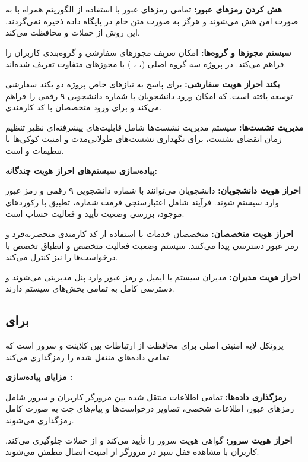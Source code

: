\documentclass[12pt,a4paper]{report}
\begin{document}
	\textbf{هش کردن رمزهای عبور:} تمامی رمزهای عبور با استفاده از الگوریتم  همراه با  به صورت امن هش می‌شوند و هرگز به صورت متن خام در پایگاه داده ذخیره نمی‌گردند. این روش از حملات  و  محافظت می‌کند.
	
	\textbf{سیستم مجوزها و گروه‌ها:}  امکان تعریف مجوزهای سفارشی و گروه‌بندی کاربران را فراهم می‌کند. در پروژه سه گروه اصلی (، ، ) با مجوزهای متفاوت تعریف شده‌اند.
	
	\textbf{بکند احراز هویت سفارشی:} برای پاسخ به نیازهای خاص پروژه دو بکند سفارشی توسعه یافته است.  که امکان ورود دانشجویان با شماره دانشجویی ۹ رقمی را فراهم می‌کند و  برای ورود متخصصان با کد کارمندی.
	
	\textbf{مدیریت نشست‌ها:} سیستم مدیریت نشست‌ها شامل قابلیت‌های پیشرفته‌ای نظیر تنظیم زمان انقضای نشست،  برای نگهداری نشست‌های طولانی‌مدت و امنیت کوکی‌ها با تنظیمات  و  است.
	
	\textbf{پیاده‌سازی سیستم‌های احراز هویت چندگانه:}
	
	\textbf{احراز هویت دانشجویان:} دانشجویان می‌توانند با شماره دانشجویی ۹ رقمی و رمز عبور وارد سیستم شوند. فرآیند شامل اعتبارسنجی فرمت شماره، تطبیق با رکوردهای موجود، بررسی وضعیت تأیید و فعالیت حساب است.
	
	\textbf{احراز هویت متخصصان:} متخصصان خدمات با استفاده از کد کارمندی منحصربه‌فرد و رمز عبور دسترسی پیدا می‌کنند. سیستم وضعیت فعالیت متخصص و انطباق تخصص با درخواست‌ها را نیز کنترل می‌کند.
	
	\textbf{احراز هویت مدیران:} مدیران سیستم با ایمیل و رمز عبور وارد پنل مدیریتی می‌شوند و دسترسی کامل به تمامی بخش‌های سیستم دارند.
	
	\subsection{ برای }
	پروتکل  لایه امنیتی اصلی برای محافظت از ارتباطات بین کلاینت و سرور است که تمامی داده‌های منتقل شده را رمزگذاری می‌کند.
	
	\textbf{مزایای پیاده‌سازی :}
	
	\textbf{رمزگذاری داده‌ها:} تمامی اطلاعات منتقل شده بین مرورگر کاربران و سرور شامل رمزهای عبور، اطلاعات شخصی، تصاویر درخواست‌ها و پیام‌های چت به صورت کامل رمزگذاری می‌شوند.
	
	\textbf{احراز هویت سرور:} گواهی  هویت سرور را تأیید می‌کند و از حملات  جلوگیری می‌کند. کاربران با مشاهده قفل سبز در مرورگر از امنیت اتصال مطمئن می‌شوند.
	
\end{document}

